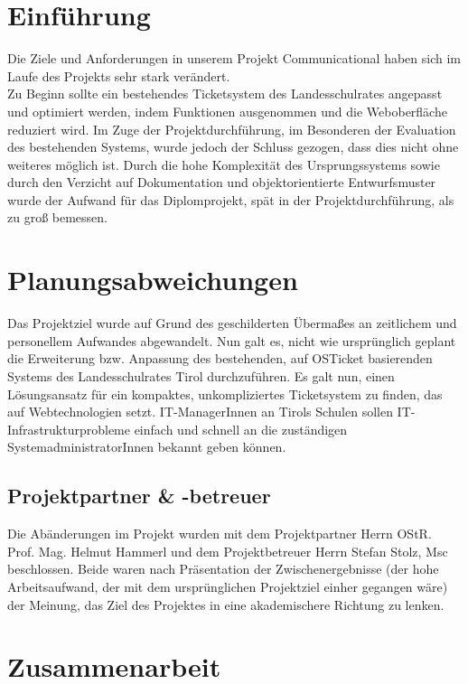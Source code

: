 	\section{Einführung}
	Die Ziele und Anforderungen in unserem Projekt Communicational haben sich im Laufe des Projekts sehr stark verändert.
	\\
	Zu Beginn sollte ein bestehendes Ticketsystem des Landesschulrates angepasst und optimiert werden, indem Funktionen ausgenommen und die Weboberfläche reduziert wird. Im Zuge der Projektdurchführung, im Besonderen der Evaluation des bestehenden Systems, wurde jedoch der Schluss gezogen, dass dies nicht ohne weiteres möglich ist. Durch die hohe Komplexität des Ursprungssystems sowie durch den Verzicht auf Dokumentation und objektorientierte Entwurfsmuster wurde der Aufwand für das Diplomprojekt, spät in der Projektdurchführung, als zu groß bemessen.
	
	\section{Planungsabweichungen}
	Das Projektziel wurde auf Grund des geschilderten Übermaßes an zeitlichem und personellem Aufwandes abgewandelt. Nun galt es, nicht wie ursprünglich geplant die Erweiterung bzw. Anpassung des bestehenden, auf OSTicket basierenden Systems des Landesschulrates Tirol durchzuführen. Es galt nun, einen Lösungsansatz für ein kompaktes, unkompliziertes Ticketsystem zu finden, das auf Webtechnologien setzt. IT-ManagerInnen an Tirols Schulen sollen IT-Infrastrukturprobleme einfach und schnell an die zuständigen SystemadministratorInnen bekannt geben können.
	
	\subsection{Projektpartner \& -betreuer}
	Die Abänderungen im Projekt wurden mit dem Projektpartner Herrn OStR. Prof. Mag. Helmut Hammerl und dem Projektbetreuer Herrn Stefan Stolz, Msc beschlossen. Beide waren nach Präsentation der Zwischenergebnisse (der hohe Arbeitsaufwand, der mit dem ursprünglichen Projektziel einher gegangen wäre) der Meinung, das Ziel des Projektes in eine akademischere Richtung zu lenken.
	
	\section{Zusammenarbeit}
